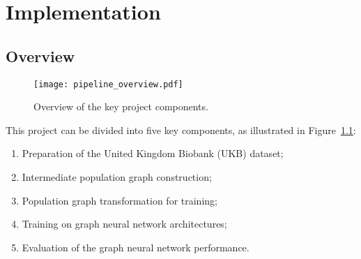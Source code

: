 \chapter{Implementation}


\section{Overview}

\begin{figure}[]
    \centering
    \texttt{[image: pipeline\_overview.pdf]}
    \caption{Overview of the key project components.}\label{pipeline-overview}
\end{figure}

This project can be divided into five key components, as illustrated in Figure~\ref{pipeline-overview}:
\begin{enumerate}
    \item Preparation of the United Kingdom Biobank (UKB) dataset;
    \item Intermediate population graph construction;
    \item Population graph transformation for training;
    \item Training on graph neural network architectures;
    \item Evaluation of the graph neural network performance.
\end{enumerate}


